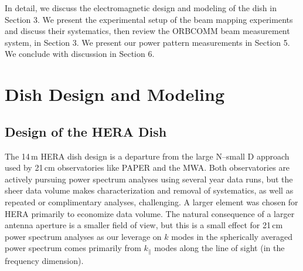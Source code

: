 \documentclass{emulateapj}
\begin{document}
In detail, we discuss the electromagnetic design and modeling of the dish in Section 3. We present the 
experimental setup of the beam mapping experiments and discuss their systematics, then 
review the ORBCOMM beam measurement system, in Section 3. We present our power pattern 
measurements in Section 5. We conclude with discussion in Section 6.

\section{Dish Design and Modeling}

\subsection{Design of the HERA Dish}

The 14\,m HERA dish design is a departure from the large N--small D approach used by 21\,cm 
observatories like PAPER and the MWA. Both observatories are actively pursuing power 
spectrum analyses using several year data runs, but the sheer data volume makes 
characterization and removal of systematics, as well as repeated or complimentary analyses, 
challenging. A larger element was chosen for HERA primarily to economize data volume. 
The natural consequence of a larger antenna aperture is a smaller field of view, but this is a 
small effect for 21\,cm power spectrum analyses as our leverage on $k$ modes in the 
spherically averaged power spectrum comes primarily from $k_\parallel$ modes along the line 
of sight (in the frequency dimension).
\end{document}
